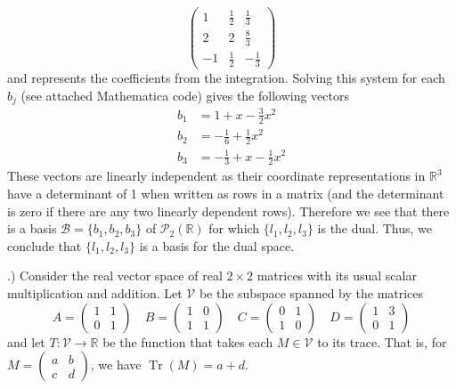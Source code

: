 \documentclass[a4paper, 11pt]{article}
\newcommand{\R}{\mathbb{R}}
\newenvironment{solution}{%
	\begin{list}{}{%
			\setlength{\topsep}{0pt}%
			\setlength{\leftmargin}{1.5cm}%
			\setlength{\rightmargin}{1.5cm}%
			\setlength{\listparindent}{\parindent}%
			\setlength{\itemindent}{\parindent}%
			\setlength{\parsep}{\parskip}%
		}%
		\item[]}{\end{list}}
\begin{document}
\begin{solution}
\begin{equation*}
\begin{pmatrix}
					1 & \frac{1}{2} & \frac{1}{3} \\ 
					2 & 2 & \frac{8}{3} \\ 
					-1 & \frac{1}{2} & -\frac{1}{3} 
				\end{pmatrix}
			\end{equation*}
		and represents the coefficients from the integration. Solving this system for each $b_j$ (see attached Mathematica code) gives the following vectors 
			\begin{align*}
				b_1 &= 1+x-\frac{3}{2}x^2 \\ 
				b_2 &= -\frac{1}{6} + \frac{1}{2}x^2 \\ 
				b_3 &= -\frac{1}{3} + x - \frac{1}{2}x^2
			\end{align*}
		These vectors are linearly independent as their coordinate representations in $\R^3$ have a determinant of 1 when written as rows in a matrix (and the determinant is zero if there are any two linearly dependent rows). Therefore we see that there is a basis $\mathcal{B}=\{b_1, b_2, b_3\}$ of $\mathcal{P}_2(\R)$ for which $\{l_1, l_2, l_3\}$ is the dual. Thus, we conclude that $\{l_1, l_2, l_3\}$ is a basis for the dual space. \\ 
	\end{solution}

.) Consider the real vector space of real $2\times 2$ matrices with its usual scalar multiplication and addition. Let $\mathcal{V}$ be the subspace spanned by the matrices 
	\begin{equation*}
		A = \begin{pmatrix}
			1 & 1 \\ 
			0 & 1 
		\end{pmatrix} \quad B = \begin{pmatrix}
			1 & 0 \\ 
			1 & 1 
		\end{pmatrix} \quad C = \begin{pmatrix}
			0 & 1 \\ 
			1 & 0
		\end{pmatrix} \quad D = \begin{pmatrix}
			1 & 3 \\ 
			0 & 1
		\end{pmatrix}
	\end{equation*}
and let $T:\mathcal{V}\to\R$ be the function that takes each $M\in\mathcal{V}$ to its trace. That is, for $M = \begin{pmatrix}
 a & b \\ 
 c & d
\end{pmatrix}$, we have $\operatorname{Tr}(M) = a+d$. \\
\end{document}
